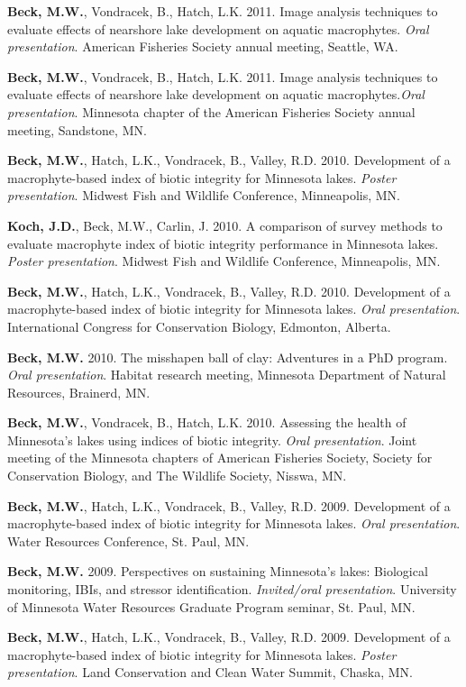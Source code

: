 \documentclass[letterpaper,12pt]{article}
\begin{document}
{\bf Beck, M.W.}, Vondracek, B., Hatch, L.K. 2011. Image analysis techniques to evaluate effects of nearshore lake development on aquatic macrophytes. \textit{Oral presentation}. American Fisheries Society annual meeting, Seattle, WA.

{\bf Beck, M.W.}, Vondracek, B., Hatch, L.K. 2011. Image analysis techniques to evaluate effects of nearshore lake development on aquatic macrophytes.\textit{Oral presentation}. Minnesota chapter of the American Fisheries Society annual meeting, Sandstone, MN.

{\bf Beck, M.W.}, Hatch, L.K., Vondracek, B., Valley, R.D. 2010. Development of a macrophyte-based index of biotic integrity for Minnesota lakes. \textit{Poster presentation}. Midwest Fish and Wildlife Conference, Minneapolis, MN.

{\bf Koch, J.D.}, Beck, M.W., Carlin, J. 2010. A comparison of survey methods to evaluate macrophyte index of biotic integrity performance in Minnesota lakes. \textit{Poster presentation}. Midwest Fish and Wildlife Conference, Minneapolis, MN.

{\bf Beck, M.W.}, Hatch, L.K., Vondracek, B., Valley, R.D. 2010. Development of a macrophyte-based index of biotic integrity for Minnesota lakes. \textit{Oral presentation}. International Congress for Conservation Biology, Edmonton, Alberta.

{\bf Beck, M.W.} 2010. The misshapen ball of clay: Adventures in a PhD program. \textit{Oral presentation}. Habitat research meeting, Minnesota Department of Natural Resources, Brainerd, MN.

{\bf Beck, M.W.}, Vondracek, B., Hatch, L.K. 2010. Assessing the health of Minnesota's lakes using indices of biotic integrity. \textit{Oral presentation}. Joint meeting of the Minnesota chapters of American Fisheries Society, Society for Conservation Biology, and The Wildlife Society, Nisswa, MN.

{\bf Beck, M.W.}, Hatch, L.K., Vondracek, B., Valley, R.D. 2009. Development of a macrophyte-based index of biotic integrity for Minnesota lakes. \textit{Oral presentation}. Water Resources Conference, St. Paul, MN.

{\bf Beck, M.W.} 2009. Perspectives on sustaining Minnesota's lakes: Biological monitoring, IBIs, and stressor identification. \textit{Invited/oral presentation}. University of Minnesota Water Resources Graduate Program seminar, St. Paul, MN.

{\bf Beck, M.W.}, Hatch, L.K., Vondracek, B., Valley, R.D. 2009. Development of a macrophyte-based index of biotic integrity for Minnesota lakes. \textit{Poster presentation}. Land Conservation and Clean Water Summit, Chaska, MN.
\end{document}
